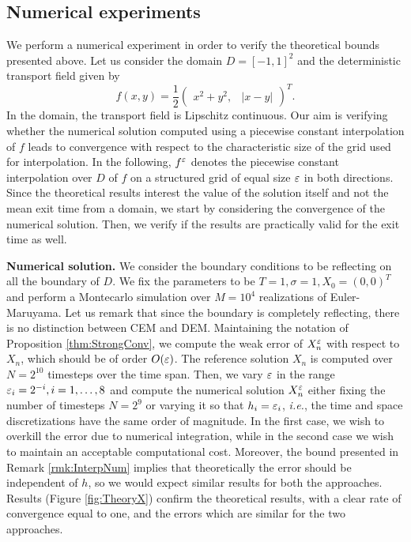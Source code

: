 \subsection{Numerical experiments}

We perform a numerical experiment in order to verify the theoretical bounds presented above. Let us consider the domain $D = [-1, 1]^2$ and the deterministic transport field given by
\begin{equation*}
	f(x, y) = \frac{1}{2} \begin{pmatrix} x^2 + y^2, & |x - y| \end{pmatrix}^T.
\end{equation*}
In the domain, the transport field is Lipschitz continuous. Our aim is verifying whether the numerical solution computed using a piecewise constant interpolation of $f$ leads to convergence with respect to the characteristic size of the grid used for interpolation. In the following, $f^\varepsilon$ denotes the piecewise constant interpolation over $D$ of $f$ on a structured grid of equal size $\varepsilon$ in both directions. Since the theoretical results interest the value of the solution itself and not the mean exit time from a domain, we start by considering the convergence of the numerical solution. Then, we verify if the results are practically valid for the exit time as well.

\vspace{2mm}
\noindent \textbf{Numerical solution.} We consider the boundary conditions to be reflecting on all the boundary of $D$. We fix the parameters to be $T = 1, \sigma = 1, X_0 = (0, 0)^T$ and perform a Montecarlo simulation over $M = 10^4$ realizations of Euler-Maruyama. Let us remark that since the boundary is completely reflecting, there is no distinction between CEM and DEM. Maintaining the notation of Proposition \ref{thm:StrongConv}, we compute the weak error of $X_n^\varepsilon$ with respect to $X_n$, which should be of order $O(\varepsilon)$. The reference solution $X_n$ is computed over $N = 2^{10}$ timesteps over the time span. Then, we vary $\varepsilon$ in the range $\varepsilon_i = 2^{-i}, i = 1,\dots, 8$ and compute the numerical solution $X_n^\varepsilon$ either fixing the number of timesteps $N = 2^9$ or varying it so that $h_i = \varepsilon_i$, \textit{i.e.}, the time and space discretizations have the same order of magnitude. In the first case, we wish to overkill the error due to numerical integration, while in the second case we wish to maintain an acceptable computational cost. Moreover, the bound presented in Remark \ref{rmk:InterpNum} implies that theoretically the error should be independent of $h$, so we would expect similar results for both the approaches. Results (Figure \ref{fig:TheoryX}) confirm the theoretical results, with a clear rate of convergence equal to one, and the errors which are similar for the two approaches.

